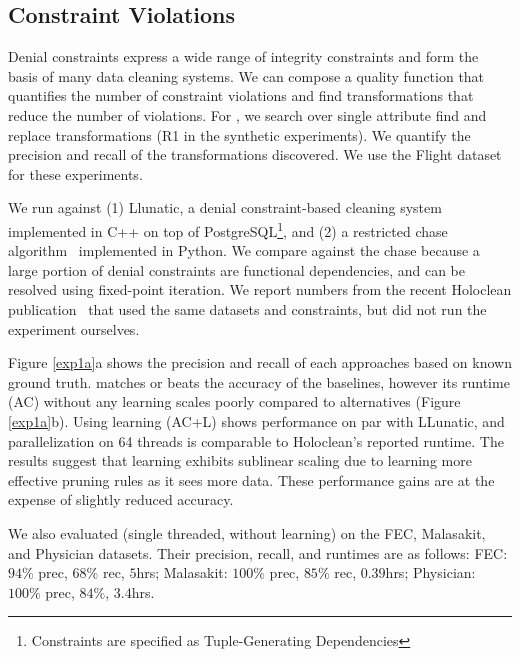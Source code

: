 \subsection{Constraint Violations}
Denial constraints express a wide range of integrity constraints and form the basis of many data cleaning systems.  We can compose a quality function that quantifies the number of constraint violations and find transformations that reduce the number of violations. For \sys, we search over single attribute find and replace transformations (R1 in the synthetic experiments). We quantify the precision and recall of the transformations discovered. We use the Flight dataset for these experiments. 

 We run against (1) Llunatic, a denial constraint-based cleaning system~\cite{DBLP:conf/sigmod/DallachiesaEEEIOT13} implemented in C++ on top of PostgreSQL\footnote{Constraints are specified as Tuple-Generating Dependencies}, and (2) a restricted chase algorithm~\cite{benedikt2017benchmarking} implemented in Python. We compare against the chase because a large portion of denial constraints are functional dependencies, and can be resolved using fixed-point iteration.  We report numbers from the recent Holoclean publication~\cite{rekatsinas2017holoclean} that used the same datasets and constraints, but did not run the experiment ourselves.

 Figure \ref{exp1a}a shows the precision and recall of each approaches based on known ground truth. \sys matches or beats the accuracy of the baselines, however its runtime (AC) without any learning scales poorly compared to alternatives (Figure~ \ref{exp1a}b).  Using learning (AC+L) shows performance on par with LLunatic, and parallelization on 64 threads is comparable to Holoclean's reported runtime. The results suggest that learning exhibits sublinear scaling due to \sys learning more effective pruning rules as it sees more data.  These performance gains are at the expense of slightly reduced accuracy. 

We also evaluated \sys (single threaded, without learning) on the FEC, Malasakit, and Physician datasets.  Their precision, recall, and runtimes are as follows: 
FEC: $94\%$ prec, $68\%$ rec, $5$hrs; 
Malasakit: $100\%$ prec, $85\%$ rec, $0.39$hrs;
Physician: $100\%$ prec, $84\%$, $3.4$hrs.


